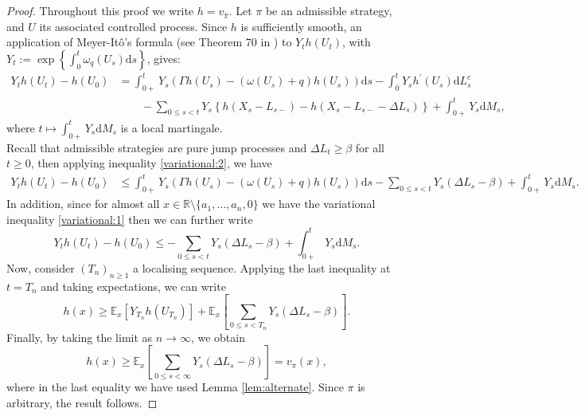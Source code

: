 \documentclass[11pt,reqno]{amsart}
\newcommand{\e}{\mathbb{E}}
\newcommand{\reals}{\mathbb{R}}
\newcommand{\diff}{\mathrm{d}}
\newcommand{\homega}{\omega_q}
\newcommand{\BRA}[1]{{{\left\{#1\right\}}}} %
\newcommand{\SBRA}[1]{{{\left[#1\right]}}} %
\renewcommand{\leq}{\leqslant}
\renewcommand{\geq}{\geqslant}
\begin{document}
\begin{proof}
	Throughout this proof we write $h = v_{\hat{\pi}}$. Let $\pi$ be an admissible strategy, and $U$ its associated controlled process. Since $h$ is sufficiently smooth, an application of Meyer-It\^{o}'s formula (see Theorem 70 in \cite{protter_2004}) to $Y_t h(U_t)$, with $Y_t := \exp\BRA{\int_0^t \homega(U_s)\diff s}$, gives:
	\begin{align*}
		Y_t h(U_t) - h (U_0) &= \int_{0+}^t Y_s\left( \Gamma h (U_s) - (\omega(U_s)+q) h (U_s) \right) \diff s - \int_{0}^t Y_s h^{\prime} (U_s) \diff L^c_s \\
		& \qquad - \sum_{0 \leq s < t} Y_s \left\lbrace h (X_s-L_{s-}) - h (X_s - L_{s-} - \Delta L_s) \right\rbrace + \int_{0+}^t Y_s \diff M_s ,
	\end{align*}
	where $t \mapsto \int_{0+}^t Y_s \diff M_s$ is a local martingale.\\
	Recall that admissible strategies are pure jump processes and $\Delta L_t \geq \beta$ for all $t\geq 0$, then applying inequality \eqref{variational:2}, we have
	\begin{align*}
		Y_t h(U_t) - h (U_0) &\leq \int_{0+}^t Y_s\left( \Gamma h (U_s) - (\omega(U_s)+q) h (U_s) \right) \diff s - \sum_{0 \leq s < t} Y_s(\Delta L_s - \beta) + \int_{0+}^t Y_s \diff M_s.
	\end{align*}
	In addition, since for almost all $x \in \reals \setminus \{a_1,\dots,a_n,0\}$ we have the variational inequality \eqref{variational:1} then we can further write
	\[
	Y_t h(U_t) - h (U_0) \leq - \sum_{0 \leq s < t} Y_s(\Delta L_s - \beta) + \int_{0+}^t Y_s \diff M_s.
	\]
	Now, consider $(T_n)_{n\geq 1}$ a localising sequence. Applying the last inequality at $t=T_n$ and taking expectations, we can write
	\[
	h(x) \geq \e_x\SBRA{Y_{T_n} h(U_{T_n})} + \e_x\SBRA{ \sum_{0 \leq s < T_n} Y_s(\Delta L_s - \beta) }.
	\]
	Finally, by taking the limit as $n \to \infty$, we obtain
	\[
	h(x) \geq \e_x\SBRA{ \sum_{0 \leq s < \infty} Y_s(\Delta L_s - \beta) } = v_\pi(x),
	\]
	where in the last equality we have used Lemma \ref{lem:alternate}. Since $\pi$ is arbitrary, the result follows.

\end{proof}
\end{document}
